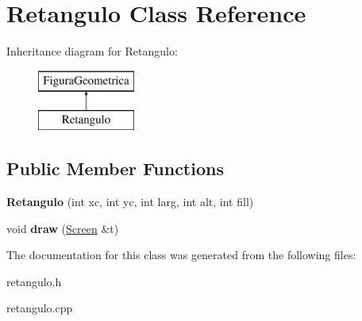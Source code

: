 \hypertarget{class_retangulo}{}\section{Retangulo Class Reference}
\label{class_retangulo}
Inheritance diagram for Retangulo\+:\begin{figure}[H]
\begin{center}
\leavevmode
\includegraphics[height=2.000000cm]{class_retangulo}
\end{center}
\end{figure}
\subsection*{Public Member Functions}
\begin{DoxyCompactItemize}
\item 
\mbox{\label{class_retangulo_ac971a3083d7f3b268acb5b9373a82c36}} 
{\bfseries Retangulo} (int xc, int yc, int larg, int alt, int fill)
\item 
\mbox{\label{class_retangulo_ac088dd6d3f4f3d3f80363a868c2e74f1}} 
void {\bfseries draw} (\mbox{\hyperlink{class_screen}{Screen}} \&t)
\end{DoxyCompactItemize}


The documentation for this class was generated from the following files\+:\begin{DoxyCompactItemize}
\item 
retangulo.\+h\item 
retangulo.\+cpp\end{DoxyCompactItemize}
